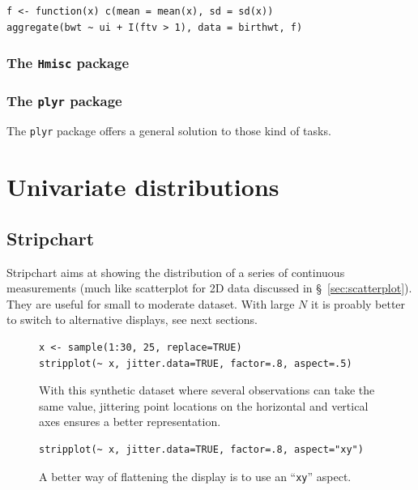\documentclass[a4paper,twoside]{book}
\newcounter{fig}
\newcommand{\img}[1]{\texttt{[image: \#1]}\stepcounter{fig}}
\renewcommand{\texttt}[1]{\lstinline{#1}}
\begin{document}
\begin{verbatim}
f <- function(x) c(mean = mean(x), sd = sd(x))
aggregate(bwt ~ ui + I(ftv > 1), data = birthwt, f)
\end{verbatim}


\subsection{The \texttt{Hmisc} package}

\subsection{The \texttt{plyr} package}
The \texttt{plyr} package\autocite{wickham11} offers a general
solution to those kind of tasks.

\chapter{Univariate distributions}

\lipsum[1]

\section{Stripchart}
Stripchart aims at showing the distribution of a series of continuous
measurements (much like scatterplot for 2D data discussed in
\S~\ref{sec:scatterplot}). They are useful for small to moderate
dataset. With large $N$ it is proably better to switch to alternative
displays, see next sections.

\begin{figure}[H]
\begin{lstlisting}
x <- sample(1:30, 25, replace=TRUE)
stripplot(~ x, jitter.data=TRUE, factor=.8, aspect=.5)
\end{lstlisting}
  \fcapside[\FBwidth] {\img{figs_lattice-crop}}
  {\caption*{With this synthetic dataset where several observations
      can take the same value, jittering point locations on the
      horizontal and vertical axes ensures a better representation.}}
\end{figure}

\begin{figure}[H]
\begin{lstlisting}
stripplot(~ x, jitter.data=TRUE, factor=.8, aspect="xy")
\end{lstlisting}
  \fcapside[\FBwidth] {\img{figs_lattice-crop}}
  {\caption*{A better way of flattening the display is to use an
      ``\texttt{xy}'' aspect.}}
\end{figure}
\end{document}
